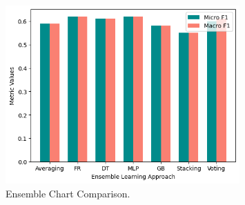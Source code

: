 \documentclass[11pt]{article}
\begin{document}
\begin{figure}[h!]
  \centering
  \includegraphics[width=0.8\textwidth, height=0.4\textheight]{./ensemble_chart.jpg}
  \caption{Ensemble Chart Comparison.}
  \label{fig:Ensemble_chart_confusion}
\end{figure}
\end{document}
